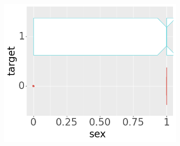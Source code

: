 \begin{figure}[btp]
\begin{subfigure}[b]{0.32\textwidth}
         \includegraphics[width=\textwidth]{plots/target-sex}
     \end{subfigure}


\end{figure}
